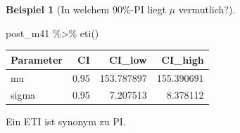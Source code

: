 \documentclass[
  a4paper,
  DIV=11]{scrreprt}
\newenvironment{Shaded}{\begin{snugshade}}{\end{snugshade}}
\newcommand{\FunctionTok}[1]{\textcolor[rgb]{0.28,0.35,0.67}{#1}}
\newcommand{\NormalTok}[1]{\textcolor[rgb]{0.00,0.23,0.31}{#1}}
\newcommand{\SpecialCharTok}[1]{\textcolor[rgb]{0.37,0.37,0.37}{#1}}
\theoremstyle{definition}
\newtheorem{example}{Beispiel}[chapter]
\theoremstyle{remark}
\begin{document}
\leavevmode{}%
\begin{example}[In welchem 90\%-PI liegt \(\mu\)
vermutlich?]\label{exm-kung4}

\begin{Shaded}
\begin{Highlighting}[]
\NormalTok{post\_m41 }\SpecialCharTok{\%\textgreater{}\%} 
  \FunctionTok{eti}\NormalTok{()}
\end{Highlighting}
\end{Shaded}

\begin{longtable}[]{@{}lrrr@{}}
\toprule()
Parameter & CI & CI\_low & CI\_high \\
\midrule()
\endhead
mu & 0.95 & 153.787897 & 155.390691 \\
sigma & 0.95 & 7.207513 & 8.378112 \\
\bottomrule()
\end{longtable}

Ein ETI ist synonym zu PI.

\end{example}
\end{document}
